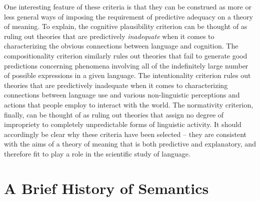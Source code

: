 One interesting feature of these criteria is that they can be construed as more or less general ways of imposing the requirement of predictive adequacy on a theory of meaning. To explain, the cognitive plausibility criterion can be thought of as ruling out theories that are predictively \textit{inadequate} when it comes to characterizing the obvious connections between language and cognition. The compositionality criterion similarly rules out theories that fail to generate good predictions concerning phenomena involving all of the indefinitely large number of possible expressions in a given language. The intentionality criterion rules out theories that are predictively inadequate when it comes to characterizing connections between language use and various non-linguistic perceptions and actions that people employ to interact with the world. The normativity criterion, finally, can be thought of as ruling out theories that assign no degree of impropriety to completely unpredictable forms of linguistic activity. It should accordingly be clear why these criteria have been selected -- they are consistent with the aims of a theory of meaning that is both predictive and explanatory, and therefore fit to play a role in the scientific study of language.  

\section{A Brief History of Semantics}

